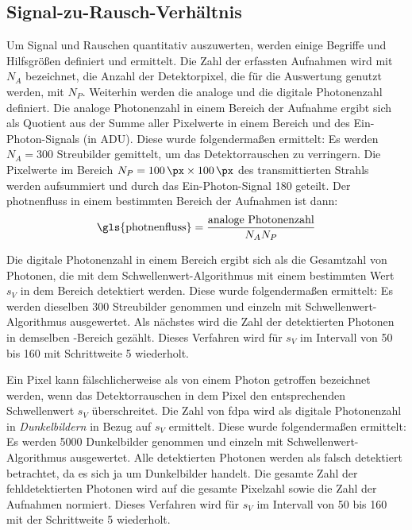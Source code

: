 \subsection{Signal-zu-Rausch-Verhältnis}
\label{text:snr}
Um Signal und Rauschen quantitativ auszuwerten, werden einige Begriffe und Hilfsgrößen definiert und ermittelt. Die Zahl der erfassten Aufnahmen wird mit $N_A$ bezeichnet, die Anzahl der Detektorpixel, die für die Auswertung genutzt werden, mit $N_P$. Weiterhin werden die analoge und die digitale Photonenzahl definiert. Die analoge Photonenzahl in einem Bereich der Aufnahme ergibt sich als Quotient aus der Summe aller Pixelwerte in einem Bereich und des Ein-Photon-Signals (in ADU). Diese wurde folgendermaßen ermittelt: Es werden $N_A = 300$ Streubilder gemittelt, um das Detektorrauschen zu verringern. Die Pixelwerte im Bereich $N_P = \qtyproduct{100 x 100}{\px}$ des transmittierten Strahls werden aufsummiert und durch das Ein-Photon-Signal \SI{180}{\adu} geteilt.
Der \gls{photnenfluss} in einem bestimmten Bereich der Aufnahmen ist dann:
\begin{equation}
    \text{\gls{photnenfluss}} = \frac{\text{analoge Photonenzahl}}{N_A N_P}
\end{equation}

\noindent
Die digitale Photonenzahl in einem Bereich ergibt sich als die Gesamtzahl von Photonen, die mit dem Schwellenwert-Algorithmus mit einem bestimmten Wert $s_V$ in dem Bereich detektiert werden. Diese wurde folgendermaßen ermittelt: Es werden dieselben 300 Streubilder genommen und einzeln mit Schwellenwert-Algorithmus ausgewertet. Als nächstes wird die Zahl der detektierten Photonen in demselben -Bereich gezählt. Dieses Verfahren wird für $s_V$ im Intervall von \SI{50}{\adu} bis \SI{160}{\adu} mit Schrittweite \SI{5}{\adu} wiederholt.

\noindent
Ein Pixel kann fälschlicherweise als von einem Photon getroffen bezeichnet werden, wenn das Detektorrauschen in dem Pixel den entsprechenden Schwellenwert $s_V$ überschreitet. Die Zahl von \gls{fdpa} wird als digitale Photonenzahl in \emph{Dunkelbildern} in Bezug auf $s_V$ ermittelt. Diese wurde folgendermaßen ermittelt: Es werden 5000 Dunkelbilder genommen und einzeln mit Schwellenwert-Algorithmus ausgewertet. Alle detektierten Photonen werden als falsch detektiert betrachtet, da es sich ja um Dunkelbilder handelt. Die gesamte Zahl der fehldetektierten Photonen wird auf die gesamte Pixelzahl  sowie die Zahl der Aufnahmen normiert. Dieses Verfahren wird für $s_V$ im Intervall von \SI{50}{\adu} bis \SI{160}{\adu} mit der Schrittweite \SI{5}{\adu} wiederholt.

